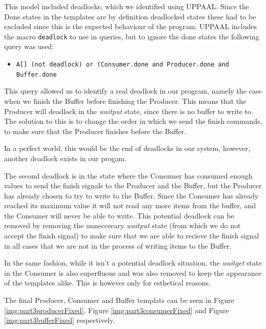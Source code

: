 \documentclass[a4paper,10pt]{article}
\newcommand{\query}[1]{\lstinline{#1}}
\begin{document}
This model included deadlocks, which we identified using UPPAAL. Since the Done states in the templates are by definition deadlocked states these had to be excluded since this is the expected behaviour of the program. UPPAAL includes the macro \texttt{deadlock} to use in queries, but to ignore the done states the following query was used:

\begin{itemize}
  \item[] \query{A[] (not deadlock) or (Consumer.done and Producer.done and Buffer.done}
\end{itemize}

This query allowed us to identify a real deadlock in our program, namely the case when we finish the Buffer before finishing the Producer. This means that the Producer will deadlock in the \emph{waitput} state, since there is no buffer to write to. The solution to this is to change the order in which we send the finish commands, to make sure that the Producer finishes before the Buffer.

In a perfect world, this would be the end of deadlocks in our system, however, another deadlock exists in our progam.

The second deadlock is in the state where the Consumer has consumed enough values to send the finish signals to the Producer and the Buffer, but the Producer has already chosen to try to write to the Buffer. Since the Consumer has already reached its maximum value it will not read any more items from the buffer, and the Consumer will never be able to write. This potential deadlock can be removed by removing the unneccecary \emph{waitput} state (from which we do not accept the finish signal) to make sure that we are able to recieve the finish signal in all cases that we are not in the process of writing items to the Buffer.

In the same fashion, while it isn't a potential deadlock situation, the \emph{waitget} state in the Consumer is also superfluous and was also removed to keep the appearance of the templates alike. This is however only for esthetical reasons.

The final Producer, Consumer and Buffer templats can be seen in Figure \ref{img:part3producerFixed}, Figure \ref{img:part3consumerFixed} and Figure \ref{img:part3bufferFixed} respectively.
\end{document}
